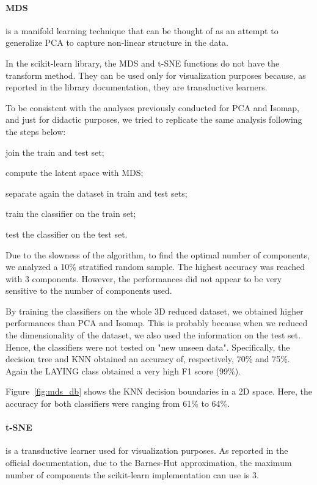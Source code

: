 \documentclass[10pt, a4paper, twocolumn]{article}
\begin{document}
\paragraph{MDS} is a manifold learning technique that can be thought of as an attempt to generalize PCA to capture non-linear structure in the data. 

In the scikit-learn library, the MDS and t-SNE functions do not have the transform method. They can be used only for visualization purposes because, as reported in the library documentation, they are transductive learners. 

To be consistent with the analyses previously conducted for PCA and Isomap, and just for didactic purposes, we tried to replicate the same analysis following the steps below: %
%
\begin{enumerate*}
    \item	join the train and test set;
    \item	compute the latent space with MDS;
    \item	separate again the dataset in train and test sets;
    \item	train the classifier on the train set;
    \item	test the classifier on the test set.
\end{enumerate*}

Due to the slowness of the algorithm, to find the optimal number of components, we analyzed a 10\% stratified random sample. The highest accuracy was reached with 3 components. However, the performances did not appear to be very sensitive to the number of components used. 

By training the classifiers on the whole 3D reduced dataset, we obtained higher performances than PCA and Isomap. This is probably because when we reduced the dimensionality of the dataset, we also used the information on the test set. Hence, the classifiers were not tested on "new unseen data". Specifically, the decision tree and KNN obtained an accuracy of, respectively, 70\% and 75\%. Again the LAYING class obtained a very high F1 score (99\%).

Figure~\ref{fig:mds_db} shows the KNN decision boundaries in a 2D space. Here, the accuracy for both classifiers were ranging from 61\% to 64\%. 

\paragraph{t-SNE} is a transductive learner used for visualization purposes. As reported in the official documentation, due to the Barnes-Hut approximation, the maximum number of components the scikit-learn implementation can use is 3. 
\end{document}
